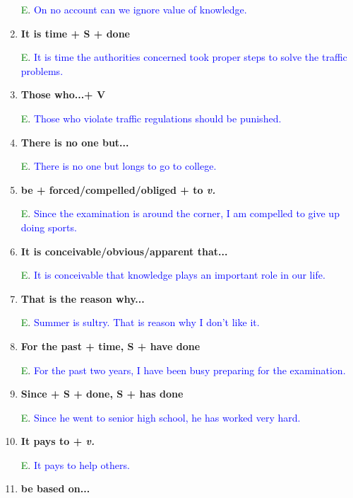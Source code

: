 \documentclass{article}
\begin{document}
\begin{enumerate}
  \textcolor{green}E. \textcolor{blue}{On no account can we ignore value of knowledge.}

\item \textbf{It is time + S + done}

  \textcolor{green}E. \textcolor{blue}{It is time the authorities concerned took proper
    steps to solve the traffic problems.}

\item \textbf{Those who...+ V}

  \textcolor{green}E. \textcolor{blue}{Those who violate traffic regulations should be punished.}

\item \textbf{There is no one but...}

  \textcolor{green}E. \textcolor{blue}{There is no one but longs to go to college.}

\item \textbf{be + forced/compelled/obliged + to \emph{v.}}

  \textcolor{green}E. \textcolor{blue}{Since the examination is around the corner, I am
    compelled to give up doing sports.}

\item \textbf{It is conceivable/obvious/apparent that... }

  \textcolor{green}E. \textcolor{blue}{It is conceivable that knowledge plays an
    important role in our life.}

\item \textbf{That is the reason why...}

  \textcolor{green}E. \textcolor{blue}{Summer is sultry. That is reason why I don't like it.}

\item \textbf{For the past + time, S + have done}

  \textcolor{green}E. \textcolor{blue}{For the past two years, I have been busy preparing
    for the examination.}

\item \textbf{Since + S + done, S + has done}

  \textcolor{green}E. \textcolor{blue}{Since he went to senior high school, he has worked
    very hard.}
  
\item \textbf{It pays to + \emph{v.}}

  \textcolor{green}E. \textcolor{blue}{It pays to help others.}

\item \textbf{be based on...}


\end{enumerate}
\end{document}
